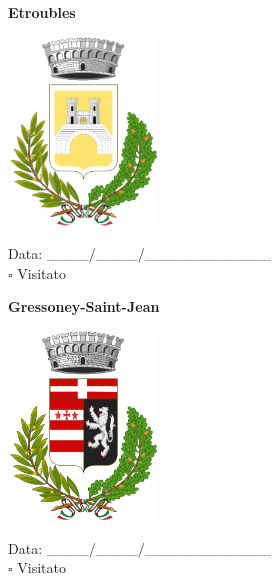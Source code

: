 \documentclass[a5paper,12pt]{article}
\begin{document}
\newpage

\noindent
\begin{minipage}[t]{0.45\textwidth}
    \begin{center}
        \textbf{Etroubles}
    \end{center}
    \vspace{-0.5cm} %
    \begin{center}
        \includegraphics[height= 5cm, width=4cm]{Valle d'Aosta/Etroubles-Stemma.png}
    \end{center}
    \vspace{-0.4cm} %
    \begin{flushleft}
        Data: \_\_\_\_/\_\_\_\_/\_\_\_\_\_\_\_\_\_\_\_\_ \\
        $\square$ Visitato
    \end{flushleft}
\end{minipage}
\hfill
\begin{minipage}[t]{0.45\textwidth}
    \begin{center}
        \textbf{Gressoney-Saint-Jean}
    \end{center}
    \vspace{-0.5cm} %
    \begin{center}
        \includegraphics[height= 5cm, width=4cm]{Valle d'Aosta/Gressoney-Saint-Jean-Stemma.png}
    \end{center}
    \vspace{-0.4cm} %
    \begin{flushleft}
        Data: \_\_\_\_/\_\_\_\_/\_\_\_\_\_\_\_\_\_\_\_\_ \\
        $\square$ Visitato
    \end{flushleft}
\end{minipage}
\end{document}
